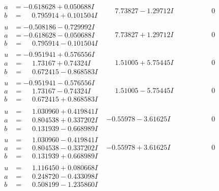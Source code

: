 \documentclass[1p]{elsarticle_modified}
\theoremstyle{definition}
\begin{document}
$$\begin{array}{c|c|c}
\begin{aligned}
a &= -0.618628 + 0.050688 I \\
b &= \phantom{-}0.795914 + 0.101504 I\end{aligned}
 & \phantom{-}7.73827 - 1.29712 I & \phantom{-0.000000 } 0 \\ \hline\begin{aligned}
u &= -0.508186 - 0.729992 I \\
a &= -0.618628 - 0.050688 I \\
b &= \phantom{-}0.795914 - 0.101504 I\end{aligned}
 & \phantom{-}7.73827 + 1.29712 I & \phantom{-0.000000 } 0 \\ \hline\begin{aligned}
u &= -0.951941 + 0.576556 I \\
a &= \phantom{-}1.73167 + 0.74324 I \\
b &= \phantom{-}0.672415 - 0.868583 I\end{aligned}
 & \phantom{-}1.51005 + 5.75445 I & \phantom{-0.000000 } 0 \\ \hline\begin{aligned}
u &= -0.951941 - 0.576556 I \\
a &= \phantom{-}1.73167 - 0.74324 I \\
b &= \phantom{-}0.672415 + 0.868583 I\end{aligned}
 & \phantom{-}1.51005 - 5.75445 I & \phantom{-0.000000 } 0 \\ \hline\begin{aligned}
u &= \phantom{-}1.030960 + 0.419841 I \\
a &= \phantom{-}0.804538 + 0.337202 I \\
b &= \phantom{-}0.131939 - 0.668989 I\end{aligned}
 & -0.55978 - 3.61625 I & \phantom{-0.000000 } 0 \\ \hline\begin{aligned}
u &= \phantom{-}1.030960 - 0.419841 I \\
a &= \phantom{-}0.804538 - 0.337202 I \\
b &= \phantom{-}0.131939 + 0.668989 I\end{aligned}
 & -0.55978 + 3.61625 I & \phantom{-0.000000 } 0 \\ \hline\begin{aligned}
u &= \phantom{-}1.116450 + 0.080668 I \\
a &= \phantom{-}0.248720 - 0.433098 I \\
b &= \phantom{-}0.508199 - 1.235860 I\end{aligned}

\end{array}$$
\end{document}
